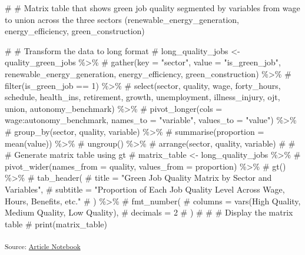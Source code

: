 \documentclass[
  letterpaper,
  DIV=11,
  numbers=noendperiod]{scrartcl}
\newenvironment{Shaded}{\begin{snugshade}}{\end{snugshade}}
\newcommand{\CommentTok}[1]{\textcolor[rgb]{0.37,0.37,0.37}{#1}}
\begin{document}
\begin{Shaded}
\begin{Highlighting}[]
\CommentTok{\# \# Matrix table that shows green job quality segmented by variables from wage to union across the three sectors (renewable\_energy\_generation, energy\_efficiency, green\_construction)}

\CommentTok{\# \# Transform the data to long format}
\CommentTok{\# long\_quality\_jobs \textless{}{-} quality\_green\_jobs \%\textgreater{}\%}
\CommentTok{\#   gather(key = "sector", value = "is\_green\_job", renewable\_energy\_generation, energy\_efficiency, green\_construction) \%\textgreater{}\%}
\CommentTok{\#   filter(is\_green\_job == 1) \%\textgreater{}\%}
\CommentTok{\#   select(sector, quality, wage, forty\_hours, schedule, health\_ins, retirement, growth, unemployment, illness\_injury, ojt, union, autonomy\_benchmark) \%\textgreater{}\%}
\CommentTok{\#   pivot\_longer(cols = wage:autonomy\_benchmark, names\_to = "variable", values\_to = "value") \%\textgreater{}\%}
\CommentTok{\#   group\_by(sector, quality, variable) \%\textgreater{}\%}
\CommentTok{\#   summarise(proportion = mean(value)) \%\textgreater{}\%}
\CommentTok{\#   ungroup() \%\textgreater{}\%}
\CommentTok{\#   arrange(sector, quality, variable)}
\CommentTok{\# }
\CommentTok{\# \# Generate matrix table using gt}
\CommentTok{\# matrix\_table \textless{}{-} long\_quality\_jobs \%\textgreater{}\%}
\CommentTok{\#   pivot\_wider(names\_from = quality, values\_from = proportion) \%\textgreater{}\%}
\CommentTok{\#   gt() \%\textgreater{}\%}
\CommentTok{\#   tab\_header(}
\CommentTok{\#     title = "Green Job Quality Matrix by Sector and Variables",}
\CommentTok{\#     subtitle = "Proportion of Each Job Quality Level Across Wage, Hours, Benefits, etc."}
\CommentTok{\#   ) \%\textgreater{}\%}
\CommentTok{\#   fmt\_number(}
\CommentTok{\#     columns = vars(\textasciigrave{}High Quality\textasciigrave{}, \textasciigrave{}Medium Quality\textasciigrave{}, \textasciigrave{}Low Quality\textasciigrave{}),}
\CommentTok{\#     decimals = 2}
\CommentTok{\#   )}
\CommentTok{\# }
\CommentTok{\# \# Display the matrix table}
\CommentTok{\# print(matrix\_table)}
\end{Highlighting}
\end{Shaded}

\textsubscript{Source:
\href{https://beeckcenter.github.io/climate-equity-workforce/index-preview.html}{Article
Notebook}}
\end{document}
